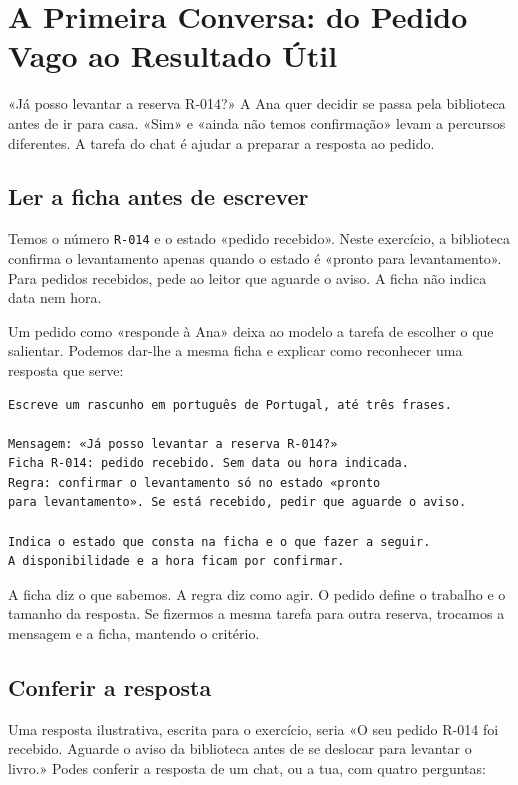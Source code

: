 \chapter{A Primeira Conversa: do Pedido Vago ao Resultado Útil}
\label{ch:primeira-conversa}

\ficcao «Já posso levantar a reserva R-014?» A Ana quer decidir se passa pela biblioteca antes de ir para casa. «Sim» e «ainda não temos confirmação» levam a percursos diferentes. A tarefa do chat é ajudar a preparar a resposta ao pedido.

\section{Ler a ficha antes de escrever}

Temos o número \texttt{R-014} e o estado «pedido recebido». Neste exercício, a biblioteca confirma o levantamento apenas quando o estado é «pronto para levantamento». Para pedidos recebidos, pede ao leitor que aguarde o aviso. A ficha não indica data nem hora.

Um pedido como «responde à Ana» deixa ao modelo a tarefa de escolher o que salientar. Podemos dar-lhe a mesma ficha e explicar como reconhecer uma resposta que serve:

\begin{lstlisting}
Escreve um rascunho em português de Portugal, até três frases.

Mensagem: «Já posso levantar a reserva R-014?»
Ficha R-014: pedido recebido. Sem data ou hora indicada.
Regra: confirmar o levantamento só no estado «pronto
para levantamento». Se está recebido, pedir que aguarde o aviso.

Indica o estado que consta na ficha e o que fazer a seguir.
A disponibilidade e a hora ficam por confirmar.
\end{lstlisting}

A ficha diz o que sabemos. A regra diz como agir. O pedido define o trabalho e o tamanho da resposta. Se fizermos a mesma tarefa para outra reserva, trocamos a mensagem e a ficha, mantendo o critério.

\section{Conferir a resposta}

Uma resposta ilustrativa, escrita para o exercício, seria «O seu pedido R-014 foi recebido. Aguarde o aviso da biblioteca antes de se deslocar para levantar o livro.» Podes conferir a resposta de um chat, ou a tua, com quatro perguntas:


